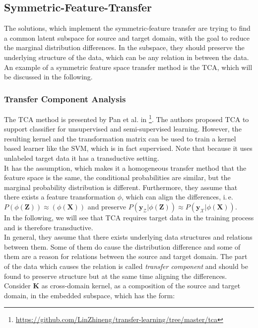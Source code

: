 \subsection{Symmetric-Feature-Transfer}\label{TlSubSecHomoSymFeature}
The solutions, which implement the symmetric-feature transfer are trying to find a common latent subspace for source and target domain, with the goal to reduce the marginal distribution differences.
In the subspace, they should preserve the underlying structure of the data, which can be any relation in between the data.
An example of a symmetric feature space transfer method is the \ac{TCA}, which will be discussed in the following.\cite[p. 6]{Weiss.2016}
\subsubsection{Transfer Component Analysis}
The \acs{TCA} method is presented by Pan et al. in \cite{Pan.2011}\footnote{\url{https://github.com/LinZhineng/transfer-learning/tree/master/tca}}.
The authors proposed \acs{TCA} to support classifier for unsupervised and semi-supervised learning.\cite{Pan.2011}
However, the resulting kernel and the transformation matrix can be used to train a kernel based learner like the \acs{SVM}, which is in fact supervised.
Note that because it uses unlabeled target data it has a transductive setting.\\
It has the assumption, which makes it a homogeneous transfer method that the feature space is the same, the conditional probabilities are similar, but the marginal probability distribution is different.
Furthermore, they assume that there exists a feature transformation $\phi$, which can align the differences, i.\,e. $P(\phi(\mathbf{Z})) \approx(\phi(\mathbf{X}))$ and preserve $P(\mathbf{y}_\mathcal{Z}\vert \phi(\mathbf{Z}))\approx P(\mathbf{y}_\mathcal{X}\vert \phi(\mathbf{X}))$.\cite{Pan.2011}\\
In the following, we will see that \acs{TCA} requires target data in the training process and is therefore transductive.\\
In general, they assume that there exists underlying data structures and relations between them.
Some of them do cause the distribution difference and some of them are a reason for relations between the source and target domain.
The part of the data which causes the relation is called \textit{transfer component} and should be found to preserve structure but at the same time aligning the differences.\cite{Pan.2011}\\
Consider $\mathbf{K}$ as cross-domain kernel, as a composition of the source and target domain, in the embedded subspace, which has the form:\cite{Pan.2011}
